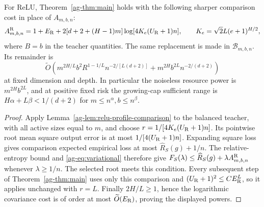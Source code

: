 \begin{corollary}
\label{ag-cor:relu-cost}
For ReLU, Theorem~\ref{ag-thm:main} holds with the following sharper comparison cost in place of $A_{m,b,n}$:
\[
 A^{\rm R}_{m,b,n}=1+E_{\rm R}
 +2[d+2+(H-1)m]\log[4K_e(U_{\rm R}+1)n],
 \qquad K_e=\sqrt2L(e+1)^{H/2},
\]
where $B=b$ in the teacher quantities. The same replacement is made in $\mathcal B_{m,b,n}$. Its remainder is
\[
 \widetilde O\left(
 m^{2H/L}b^2 R^{1-1/L}n^{-2/[L(d+2)]}
       +m^{2H}b^{2L}n^{-2/(d+2)}\right)
\]
at fixed dimension and depth. In particular the noiseless resource power is $m^{2H}b^{2L}$, and at positive fixed risk the growing-cap sufficient range is $H\alpha+L\beta<1/(d+2)$ for $m\le n^\alpha,b\le n^\beta$.
\end{corollary}
\begin{proof}
Apply Lemma~\ref{ag-lem:relu-profile-comparison} to the balanced teacher, with all active sizes equal to $m$, and choose $r=1/[4K_e(U_{\rm R}+1)n]$. Its pointwise root mean square output error is at most $1/[4(U_{\rm R}+1)n]$. Expanding square loss gives comparison expected empirical loss at most $\widehat R_S(g)+1/n$. The relative-entropy bound and \eqref{ag-eq:variational} therefore give $F_S(\lambda)\le\widehat R_S(g)+\lambda A^{\rm R}_{m,b,n}$ whenever $\lambda\ge1/n$. The selected root meets this condition. Every subsequent step of Theorem~\ref{ag-thm:main} uses only this comparison and $(U_{\rm R}+1)^2\le C E_{\rm R}^L$, so it applies unchanged with $r=L$. Finally $2H/L\ge1$, hence the logarithmic covariance cost is of order at most $\widetilde O(E_{\rm R})$, proving the displayed powers.
\end{proof}
